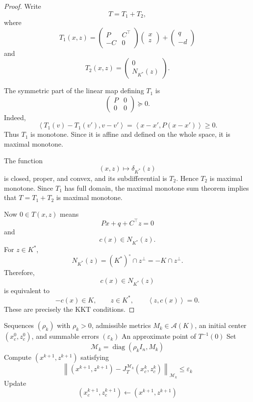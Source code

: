 \documentclass[a4paper,11pt]{book}
\theoremstyle{plain}
\theoremstyle{definition}
\theoremstyle{remark}
\numberwithin{equation}{chapter}
\numberwithin{algorithm}{chapter}
\newcommand{\norm}[1]{\left\|#1\right\|}
\newcommand{\inner}[2]{\left\langle #1, #2 \right\rangle}
\newcommand{\diag}{\operatorname{diag}}
\begin{document}
	\begin{proof}
		Write
		\[
		T=T_1+T_2,
		\]
		where
		\[
		T_1(x,z)
		=
		\begin{pmatrix}
			P&C^\top\\
			-C&0
		\end{pmatrix}
		\begin{pmatrix}
			x\\z
		\end{pmatrix}
		+
		\begin{pmatrix}
			q\\-d
		\end{pmatrix}
		\]
		and
		\[
		T_2(x,z)
		=
		\begin{pmatrix}
			0\\
			N_{K^*}(z)
		\end{pmatrix}.
		\]
		
		The symmetric part of the linear map defining \(T_1\) is
		\[
		\begin{pmatrix}
			P&0\\
			0&0
		\end{pmatrix}
		\succeq0.
		\]
		Indeed,
		\[
		\inner{T_1(v)-T_1(v')}{v-v'}
		=
		\inner{x-x'}{P(x-x')}
		\geq0.
		\]
		Thus \(T_1\) is monotone. Since it is affine and defined on the whole space,
		it is maximal monotone.
		
		The function
		\[
		(x,z)\longmapsto\delta_{K^*}(z)
		\]
		is closed, proper, and convex, and its subdifferential is \(T_2\). Hence
		\(T_2\) is maximal monotone. Since \(T_1\) has full domain, the maximal
		monotone sum theorem implies that \(T=T_1+T_2\) is maximal monotone.
		
		Now \(0\in T(x,z)\) means
		\[
		Px+q+C^\top z=0
		\]
		and
		\[
		c(x)\in N_{K^*}(z).
		\]
		For \(z\in K^*\),
		\[
		N_{K^*}(z)
		=
		(K^*)^\circ\cap z^\perp
		=
		-K\cap z^\perp.
		\]
		Therefore,
		\[
		c(x)\in N_{K^*}(z)
		\]
		is equivalent to
		\[
		-c(x)\in K,
		\qquad
		z\in K^*,
		\qquad
		\inner{z}{c(x)}=0.
		\]
		These are precisely the KKT conditions.
	\end{proof}
	
	\begin{algorithm}[H]
		\caption{Proximal method of multipliers}
		\begin{algorithmic}[1]
			\Require Sequences \((\rho_k)\) with \(\rho_k>0\), admissible metrics
			\(M_k\in\mathcal A(K)\), an initial center
			\((x_c^0,z_c^0)\), and summable errors \((\varepsilon_k)\)
			\Ensure An approximate point of \(T^{-1}(0)\)
			\State Set
			\[
			\mathcal M_k
			=
			\diag(\rho_kI_n,M_k)
			\]
			\State Compute \((x^{k+1},z^{k+1})\) satisfying
			\[
			\norm{
				(x^{k+1},z^{k+1})
				-
				J_T^{\mathcal M_k}(x_c^k,z_c^k)
			}_{\mathcal M_k}
			\leq
			\varepsilon_k
			\]
			\State Update
			\[
			(x_c^{k+1},z_c^{k+1})
			\gets
			(x^{k+1},z^{k+1})
			\]
			\EndFor
		\end{algorithmic}
	\end{algorithm}
	
\end{document}
